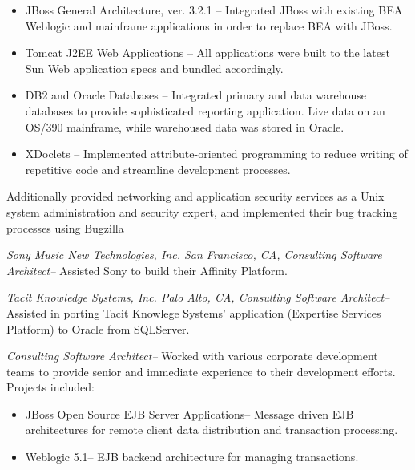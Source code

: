 \documentclass[10pt]{report}
\begin{document}
\begin{description}
\begin{list}{-}{}
\begin{itemize}
				\item{JBoss General Architecture, ver. 3.2.1 --} Integrated JBoss with
				existing BEA Weblogic and mainframe applications in order to replace BEA
				with JBoss.

				\item{Tomcat J2EE Web Applications --}  All applications were built to
				the latest Sun Web application specs and bundled accordingly.

				\item{DB2 and Oracle Databases --}  Integrated primary and data
				warehouse databases to provide sophisticated reporting application.
				Live data on an OS/390 mainframe, while warehoused data was stored in
				Oracle.

				\item{XDoclets --}  Implemented attribute-oriented programming to reduce
				writing of repetitive code and streamline development processes.

			\end{itemize}

			Additionally provided networking and application security services as a
			Unix system administration and security expert, and implemented their bug
			tracking processes using Bugzilla

			\item{\emph{Sony Music New Technologies, Inc. San Francisco, CA,
			Consulting Software Architect--}}  Assisted Sony to build their Affinity
			Platform.

			\item{\emph{Tacit Knowledge Systems, Inc. Palo Alto, CA, Consulting
			Software Architect--}}  Assisted in porting Tacit Knowlege Systems'
			application (Expertise Services Platform) to Oracle from SQLServer.

			\item{\emph{Consulting Software Architect--}}  Worked with various
			corporate development teams to provide senior and immediate experience to
			their development efforts.  Projects included:

			\begin{itemize}

				\item{JBoss Open Source EJB Server Applications--} Message driven EJB
				architectures for remote client data distribution and transaction
				processing.

				\item{Weblogic 5.1--} EJB backend architecture for managing
				transactions.


\end{itemize}
\end{list}
\end{description}
\end{document}
